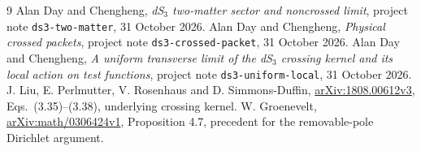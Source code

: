 \documentclass[11pt,a4paper]{article}
\begin{document}
\begin{thebibliography}{9}
 Alan Day and Chengheng,
\emph{dS$_3$ two-matter sector and noncrossed limit},
project note \texttt{ds3-two-matter}, 31 October 2026.
 Alan Day and Chengheng,
\emph{Physical crossed packets}, project note \texttt{ds3-crossed-packet},
31 October 2026.
 Alan Day and Chengheng,
\emph{A uniform transverse limit of the dS$_3$ crossing kernel and its
local action on test functions}, project note \texttt{ds3-uniform-local},
31 October 2026.
 J. Liu, E. Perlmutter, V. Rosenhaus and D. Simmons-Duffin,
\href{https://arxiv.org/html/1808.00612v3}{arXiv:1808.00612v3},
Eqs.\ (3.35)--(3.38), underlying crossing kernel.
 W. Groenevelt,
\href{https://arxiv.org/html/math/0306424v1}{arXiv:math/0306424v1},
Proposition 4.7, precedent for the removable-pole Dirichlet argument.
\end{thebibliography}
\end{document}
